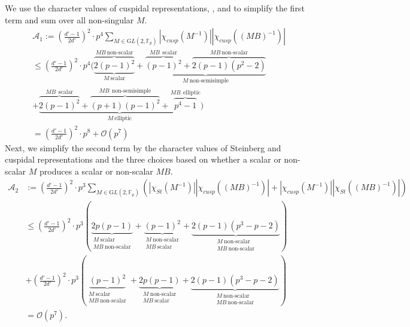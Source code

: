 \documentclass[12pt,reqno]{amsart}
\theoremstyle{plain}
\theoremstyle{definition}
\newcommand{\GL}{{\mathrm GL}}
\newcommand{\sA}{{\mathcal A}}
\newcommand{\sO}{{\mathcal O}}
\theoremstyle{remark}
\newcommand{\FF}{\mathbb{F}}
\begin{document}
We use the character values of cuspidal representations, ,  and  to simplify the first term and sum over all non-singular $M.$
\begin{align*}
    &\sA_1:=\left({\frac{d' -1}{2d'}}\right)^2\cdot p^4 \sum_{M \in \GL(2, \FF_p)}|\chi_{cusp}(M^{-1})||\chi_{cusp}((MB)^{-1})|\\
    &\leq \left({\frac{d' -1}{2d'}}\right)^2\cdot p^4 (\underbrace{\overbrace{2(p-1)^2}^{MB ~\text{non-scalar}}}_{M ~\text{scalar}}+ \underbrace{\overbrace{(p-1)^2}^{MB ~~\text{scalar}}+ \overbrace{2(p-1)(p^2-2)}^{MB ~\text{non-scalar}} }_{M ~\text{non-semisimple}}\\ &+ \underbrace{\overbrace{2(p-1)^2}^{MB ~~\text{scalar}}+\overbrace{(p+1)(p-1)^2}^{MB ~~\text{non-semisimple}} +\overbrace{p^4-1}^{MB ~~\text{elliptic}} } _{M ~\text{elliptic}} )\\
    &= \left({\frac{d' -1}{2d'}}\right)^2\cdot p^8 + \sO(p^7)
\end{align*}
Next, we simplify the second term by the character values of Steinberg and cuspidal representations and the three choices based on whether a scalar or non-scalar $M$ produces a scalar or non-scalar $MB$. 
\begin{align*}
  \sA_2&:= \left(\frac{d' -1}{2d'}\right)^2\cdot p^3\sum_{M \in \GL(2, \FF_p)}\left(|\chi_{St}(M^{-1})||\chi_{cusp}((MB)^{-1})| + |\chi_{cusp}(M^{-1})||\chi_{St}((MB)^{-1})|\right)\\
  &\leq \left(\frac{d' -1}{2d'}\right)^2\cdot p^3 \left(\underbrace{2p(p-1)}_{\substack{M~ \text{scalar}\\ MB ~\text{non-scalar}}}+\underbrace{(p-1)^2}_{\substack{M~ \text{non-scalar}\\ MB ~\text{scalar}}}+ \underbrace{2(p-1)(p^3-p-2)}_{\substack{M~ \text{non-scalar}\\ MB ~\text{non-scalar}}} \right)\\
   &+\left(\frac{d' -1}{2d'}\right)^2\cdot p^3 \left(\underbrace{(p-1)^2}_{\substack{M~ \text{scalar}\\ MB ~\text{non-scalar}}}+\underbrace{2p(p-1)}_{\substack{M~ \text{non-scalar}\\ MB ~\text{scalar}}}+ \underbrace{2(p-1)(p^3-p-2)}_{\substack{M~ \text{non-scalar}\\ MB ~\text{non-scalar}}} \right)\\
   &= \sO(p^7).
\end{align*} 
\end{document}
